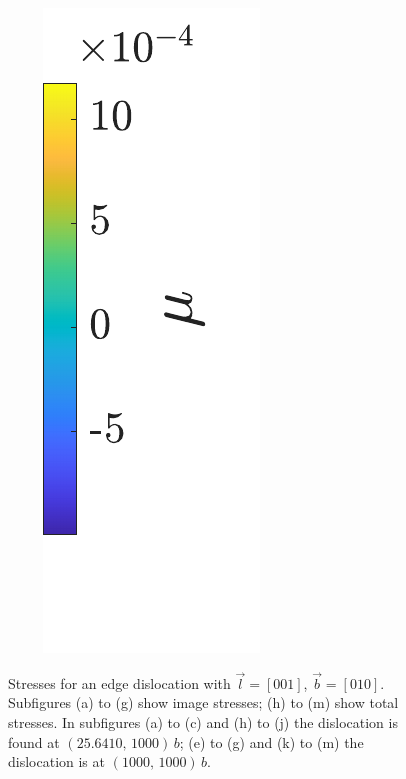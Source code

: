 \documentclass[11pt]{iopart}
\begin{document}
\begin{figure}
    \hspace*{0.28cm}~
    ~
    ~
    {
    {\includegraphics[height=0.227\linewidth]{images/sxxNAEparTot11_leg.pdf}}
    }
    \caption{Stresses for an edge dislocation with $\vec{l} = [0 0 1]$, $\vec{b} = [0 1 0]$. Subfigures (a) to (g) show image stresses; (h) to (m) show total stresses. In subfigures (a) to (c) and (h) to (j) the dislocation is found at $(25.6410,\, 1000)\, b$; (e) to (g) and (k) to (m) the dislocation is at $(1000,\, 1000)\, b$.}
    \label{f:head_vs_ana_vs_num_epar2to11}
\end{figure}
\end{document}
